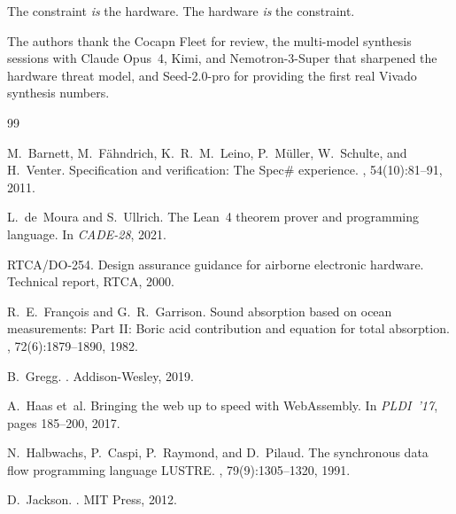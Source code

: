 \documentclass[sigplan,10pt,review]{acmart}
\begin{document}
The constraint \emph{is} the hardware. The hardware \emph{is} the constraint.

\begin{acks}
The authors thank the Cocapn Fleet for review, the multi-model synthesis sessions
with Claude Opus~4, Kimi, and Nemotron-3-Super that sharpened the hardware
threat model, and Seed-2.0-pro for providing the first real Vivado synthesis numbers.
\end{acks}


\begin{thebibliography}{99}

M.~Barnett, M.~F{\"a}hndrich, K.~R.~M.~Leino, P.~M{\"u}ller, W.~Schulte, and H.~Venter.
\newblock Specification and verification: The {Spec\#} experience.
, 54(10):81--91, 2011.

L.~de~Moura and S.~Ullrich.
\newblock The {Lean~4} theorem prover and programming language.
\newblock In {\em CADE-28}, 2021.

{RTCA/DO-254}.
\newblock Design assurance guidance for airborne electronic hardware.
\newblock Technical report, RTCA, 2000.

R.~E.~Fran\c{c}ois and G.~R.~Garrison.
\newblock Sound absorption based on ocean measurements: Part {II}: Boric acid contribution and equation for total absorption.
, 72(6):1879--1890, 1982.

B.~Gregg.
.
\newblock Addison-Wesley, 2019.

A.~Haas et~al.
\newblock Bringing the web up to speed with {WebAssembly}.
\newblock In {\em PLDI~'17}, pages 185--200, 2017.

N.~Halbwachs, P.~Caspi, P.~Raymond, and D.~Pilaud.
\newblock The synchronous data flow programming language {LUSTRE}.
, 79(9):1305--1320, 1991.

D.~Jackson.
.
\newblock MIT Press, 2012.


\end{thebibliography}
\end{document}
